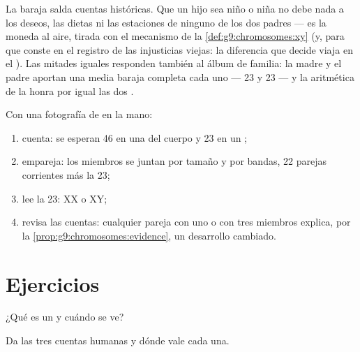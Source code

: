 \begin{example}\label{ex:g9:chromosomes:answers}
La baraja salda cuentas históricas. Que un hijo sea niño o niña no debe
nada a los deseos, las dietas ni las estaciones de ninguno de los dos
padres --- es la moneda al aire, tirada con el mecanismo de la
\cref{def:g9:chromosomes:xy} (y, para que conste en el registro de las
injusticias viejas: la diferencia que decide viaja en el
\emph{}). Las mitades iguales responden también al álbum
de familia: la madre y el padre aportan una media baraja completa cada
uno --- 23 y 23 --- y la aritmética de la  honra por igual las
dos .
\end{example}

\begin{method}\label{met:g9:chromosomes:read}
Con una fotografía de  en la mano:
\begin{enumerate}
  \item cuenta: se esperan 46 en una  del cuerpo y 23 en un
        ;
  \item empareja: los miembros se juntan por tamaño y por bandas, 22
        parejas corrientes más la 23;
  \item lee la 23: XX o XY;
  \item revisa las cuentas: cualquier pareja con uno o con tres
        miembros explica, por la
        \cref{prop:g9:chromosomes:evidence}, un desarrollo cambiado.
\end{enumerate}
\end{method}

\section{Ejercicios}

\begin{exercise}[$\star$]\label{exo:g9:chromosomes:1}
¿Qué es un  y cuándo se ve?
\end{exercise}

\begin{exercise}[$\star$]\label{exo:g9:chromosomes:2}
Da las tres cuentas humanas y dónde vale cada una.
\end{exercise}

